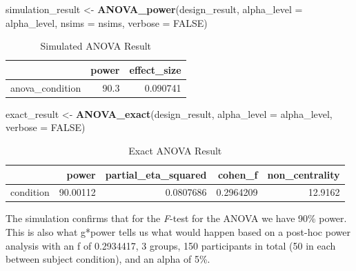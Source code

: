 \documentclass[]{book}
\newenvironment{Shaded}{\begin{snugshade}}{\end{snugshade}}
\newcommand{\DataTypeTok}[1]{\textcolor[rgb]{0.13,0.29,0.53}{#1}}
\newcommand{\KeywordTok}[1]{\textcolor[rgb]{0.13,0.29,0.53}{\textbf{#1}}}
\newcommand{\NormalTok}[1]{#1}
\newcommand{\OtherTok}[1]{\textcolor[rgb]{0.56,0.35,0.01}{#1}}
\newcommand{\StringTok}[1]{\textcolor[rgb]{0.31,0.60,0.02}{#1}}
\begin{document}
\begin{Shaded}
\begin{Highlighting}[]
\NormalTok{simulation_result <-}\StringTok{ }\KeywordTok{ANOVA_power}\NormalTok{(design_result, }
                                 \DataTypeTok{alpha_level =}\NormalTok{ alpha_level, }
                                 \DataTypeTok{nsims =}\NormalTok{ nsims,}
                                 \DataTypeTok{verbose =} \OtherTok{FALSE}\NormalTok{)}
\end{Highlighting}
\end{Shaded}

\begin{table}[!h]

\caption{\label{tab:unnamed-chunk-41}Simulated ANOVA Result}
\centering
\begin{tabular}{l|r|r}
\hline
  & power & effect\_size\\
\hline
anova\_condition & 90.3 & 0.090741\\
\hline
\end{tabular}
\end{table}

\begin{Shaded}
\begin{Highlighting}[]
\NormalTok{exact_result <-}\StringTok{ }\KeywordTok{ANOVA_exact}\NormalTok{(design_result,}
                            \DataTypeTok{alpha_level =}\NormalTok{ alpha_level,}
                            \DataTypeTok{verbose =} \OtherTok{FALSE}\NormalTok{)}
\end{Highlighting}
\end{Shaded}

\begin{table}[!h]

\caption{\label{tab:unnamed-chunk-43}Exact ANOVA Result}
\centering
\begin{tabular}{l|r|r|r|r}
\hline
  & power & partial\_eta\_squared & cohen\_f & non\_centrality\\
\hline
condition & 90.00112 & 0.0807686 & 0.2964209 & 12.9162\\
\hline
\end{tabular}
\end{table}

The simulation confirms that for the \emph{F}-test for the ANOVA we have 90\% power. This is also what g*power tells us what would happen based on a post-hoc power analysis with an f of 0.2934417, 3 groups, 150 participants in total (50 in each between subject condition), and an alpha of 5\%.
\end{document}
